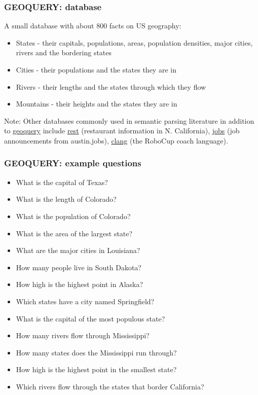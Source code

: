 \documentclass[ignorenonframetext]{beamer}
\begin{document}
\begin{frame}\frametitle{GEOQUERY: database}
A small database with about 800 facts on US geography:
\begin{itemize}
\item States - their capitals, populations, areas, population densities,
major cities, rivers and the bordering states
\item Cities - their populations and the states they are in
\item Rivers - their lengths and the states through which they flow
\item Mountains - their heights and the states they are in
\end{itemize}
\vspace*{1cm}
Note: Other databases commonly used in semantic parsing literature in addition to
\href{http://www.cs.utexas.edu/users/ml/nldata/geo.html}{\sc geoquery} include
\href{http://www.cs.utexas.edu/users/ml/nldata/restquery.html}{\sc rest} (restaurant information in N. California),
\href{http://www.cs.utexas.edu/users/ml/nldata/jobquery.html}{\sc jobs} (job announcements from austin.jobs),
\href{http://www.cs.utexas.edu/users/ml/nldata/clang.html}{\sc clang} (the RoboCup coach language).
\end{frame}

\begin{frame}\frametitle{GEOQUERY: example questions}
\begin{itemize}
\item What is the capital of Texas?
\item What is the length of Colorado?
\item What is the population of Colorado?
\item What is the area of the largest state?
\item What are the major cities in Louisiana?
\item How many people live in South Dakota?
\item How high is the highest point in Alaska?
\item Which states have a city named Springfield?
\item What is the capital of the most populous state?
\item How many rivers flow through Mississippi?
\item How many states does the Mississippi run through?
\item How high is the highest point in the smallest state?
\item Which rivers flow through the states that border California?
\end{itemize}
\end{frame}
\end{document}
